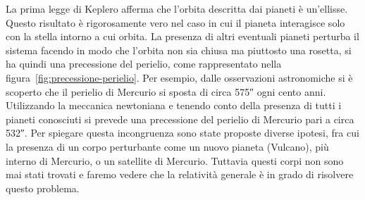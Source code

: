 La prima legge di Keplero afferma che l'orbita descritta dai pianeti è
un'ellisse.  Questo risultato è rigorosamente vero nel caso in cui il pianeta
interagisce solo con la stella intorno a cui orbita.  La presenza di altri
eventuali pianeti perturba il sistema facendo in modo che l'orbita non sia
chiusa ma piuttosto una rosetta, si ha quindi una precessione del perielio, come
rappresentato nella figura~\ref{fig:precessione-perielio}.  Per esempio, dalle
osservazioni astronomiche si è scoperto che il perielio di Mercurio si sposta di
circa \ang{;;575} ogni cento anni.  Utilizzando la meccanica newtoniana e
tenendo conto della presenza di tutti i pianeti conosciuti si prevede una
precessione del perielio di Mercurio pari a circa \ang{;;532}.  Per spiegare
questa incongruenza sono state proposte diverse ipotesi, fra cui la presenza di
un corpo perturbante come un nuovo pianeta (Vulcano), più interno di Mercurio, o
un satellite di Mercurio.  Tuttavia questi corpi non sono mai stati trovati e
faremo vedere che la relatività generale è in grado di risolvere questo
problema.

